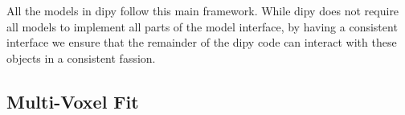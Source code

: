 All the models in dipy follow this main framework. While dipy does not require all models to implement all parts of the model interface, by having a consistent interface we ensure that the remainder of the dipy code can interact with these objects in a consistent fassion.

\subsection{Multi-Voxel Fit}
